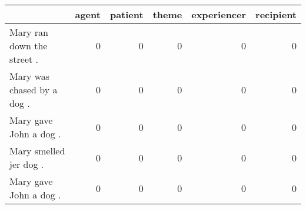 \begin{tabular}{lrrrrr}
\toprule
{} &  agent &  patient &  theme &  experiencer &  recipient \\
\midrule
Mary ran down the street . &      0 &        0 &      0 &            0 &          0 \\
Mary was chased by a dog . &      0 &        0 &      0 &            0 &          0 \\
Mary gave John a dog .     &      0 &        0 &      0 &            0 &          0 \\
Mary smelled jer dog .     &      0 &        0 &      0 &            0 &          0 \\
Mary gave John a dog .     &      0 &        0 &      0 &            0 &          0 \\
\bottomrule
\end{tabular}
